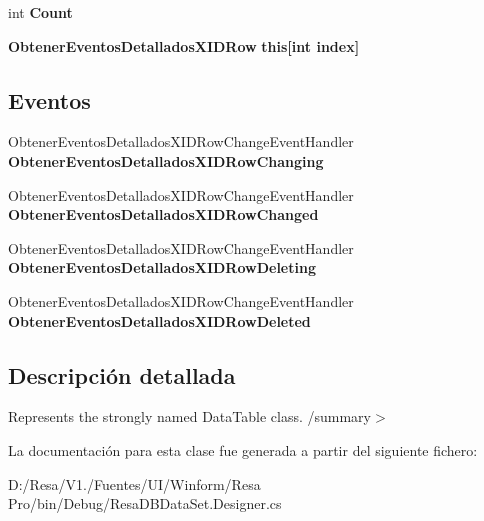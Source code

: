 \begin{DoxyCompactItemize}
\item 
int {\bfseries Count}\hspace{0.3cm}{\ttfamily  [get]}\label{class_resa___pro_1_1_resa_d_b_data_set_1_1_obtener_eventos_detallados_x_i_d_data_table_a1069dde4ff6d0c2fe1c26c1c2ca4a3a0}

\item 
{\bf Obtener\+Eventos\+Detallados\+X\+I\+D\+Row} {\bfseries this[int index]}\hspace{0.3cm}{\ttfamily  [get]}\label{class_resa___pro_1_1_resa_d_b_data_set_1_1_obtener_eventos_detallados_x_i_d_data_table_acf2b602c9b2a0efddc425dd928c3a94e}

\end{DoxyCompactItemize}
\subsection*{Eventos}
\begin{DoxyCompactItemize}
\item 
Obtener\+Eventos\+Detallados\+X\+I\+D\+Row\+Change\+Event\+Handler {\bfseries Obtener\+Eventos\+Detallados\+X\+I\+D\+Row\+Changing}\label{class_resa___pro_1_1_resa_d_b_data_set_1_1_obtener_eventos_detallados_x_i_d_data_table_af6d059d4dbc2974de2cb6155435a2b98}

\item 
Obtener\+Eventos\+Detallados\+X\+I\+D\+Row\+Change\+Event\+Handler {\bfseries Obtener\+Eventos\+Detallados\+X\+I\+D\+Row\+Changed}\label{class_resa___pro_1_1_resa_d_b_data_set_1_1_obtener_eventos_detallados_x_i_d_data_table_a6aea1f61fee1453ca2a2ed696da9e33f}

\item 
Obtener\+Eventos\+Detallados\+X\+I\+D\+Row\+Change\+Event\+Handler {\bfseries Obtener\+Eventos\+Detallados\+X\+I\+D\+Row\+Deleting}\label{class_resa___pro_1_1_resa_d_b_data_set_1_1_obtener_eventos_detallados_x_i_d_data_table_a8f6ca6cbc71b8c517bdf2718112d7f0d}

\item 
Obtener\+Eventos\+Detallados\+X\+I\+D\+Row\+Change\+Event\+Handler {\bfseries Obtener\+Eventos\+Detallados\+X\+I\+D\+Row\+Deleted}\label{class_resa___pro_1_1_resa_d_b_data_set_1_1_obtener_eventos_detallados_x_i_d_data_table_a05d3a44c77af716d40e139f47ed550cc}

\end{DoxyCompactItemize}


\subsection{Descripción detallada}
Represents the strongly named Data\+Table class. /summary$>$ 

La documentación para esta clase fue generada a partir del siguiente fichero\+:\begin{DoxyCompactItemize}
\item 
D\+:/\+Resa/\+V1./\+Fuentes/\+U\+I/\+Winform/\+Resa Pro/bin/\+Debug/Resa\+D\+B\+Data\+Set.\+Designer.\+cs\end{DoxyCompactItemize}
